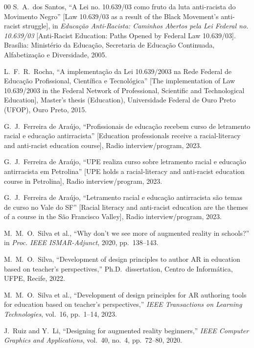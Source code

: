 \documentclass[conference]{IEEEtran}
\begin{document}
\begin{thebibliography}{00}
S.~A.~dos Santos, ``A Lei no. 10.639/03 como fruto da luta anti-racista do
Movimento Negro'' [Law 10.639/03 as a result of the Black Movement's
anti-racist struggle], in \textit{Educação Anti-Racista: Caminhos Abertos
pela Lei Federal no. 10.639/03} [Anti-Racist Education: Paths Opened by
Federal Law 10.639/03]. Brasília: Ministério da Educação, Secretaria de
Educação Continuada, Alfabetização e Diversidade, 2005.

L.~F.~R.~Rocha, ``A implementação da Lei 10.639/2003 na Rede Federal de
Educação Profissional, Científica e Tecnológica'' [The implementation of
Law 10.639/2003 in the Federal Network of Professional, Scientific and
Technological Education], Master's thesis (Education), Universidade Federal
de Ouro Preto (UFOP), Ouro Preto, 2015.

G.~J.~Ferreira de Araújo, ``Profissionais de educação recebem curso de
letramento racial e educação antirracista'' [Education professionals
receive a racial-literacy and anti-racist education course], Radio
interview/program, 2023.

G.~J.~Ferreira de Araújo, ``UPE realiza curso sobre letramento racial e
educação antirracista em Petrolina'' [UPE holds a racial-literacy and
anti-racist education course in Petrolina], Radio interview/program, 2023.

G.~J.~Ferreira de Araújo, ``Letramento racial e educação antirracista são
temas de curso no Vale do SF'' [Racial literacy and anti-racist education
are the themes of a course in the São Francisco Valley], Radio
interview/program, 2023.

M.~M.~O.~Silva et al., ``Why don't we see more of augmented reality in
schools?'' in \textit{Proc. IEEE ISMAR-Adjunct}, 2020, pp.~138--143.

M.~M.~O.~Silva, ``Development of design principles to author AR in education
based on teacher's perspectives,'' Ph.D.\ dissertation, Centro de Informática,
UFPE, Recife, 2022.

M.~M.~O.~Silva et al., ``Development of design principles for AR authoring tools
for education based on teacher's perspectives,'' \textit{IEEE Transactions on
Learning Technologies}, vol.~16, pp.~1--14, 2023.

J.~Ruiz and Y.~Li, ``Designing for augmented reality beginners,'' \textit{IEEE
Computer Graphics and Applications}, vol.~40, no.~4, pp.~72--80, 2020.


\end{thebibliography}
\end{document}
